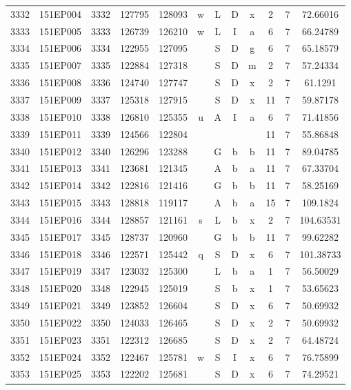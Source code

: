 \begin{tabular}{|*{12}{c|}}
3332 & 151EP004 & 3332 & 127795 & 128093 & w & L & D & x & 2 & 7 & 72.66016 \\ 
3333 & 151EP005 & 3333 & 126739 & 126210 & w & L & I & a & 6 & 7 & 66.24789 \\ 
3334 & 151EP006 & 3334 & 122955 & 127095 &  & S & D & g & 6 & 7 & 65.18579 \\ 
3335 & 151EP007 & 3335 & 122884 & 127318 &  & S & D & m & 2 & 7 & 57.24334 \\ 
3336 & 151EP008 & 3336 & 124740 & 127747 &  & S & D & x & 2 & 7 & 61.1291 \\ 
3337 & 151EP009 & 3337 & 125318 & 127915 &  & S & D & x & 11 & 7 & 59.87178 \\ 
3338 & 151EP010 & 3338 & 126810 & 125355 & u & A & I & a & 6 & 7 & 71.41856 \\ 
3339 & 151EP011 & 3339 & 124566 & 122804 &  &  &  &  & 11 & 7 & 55.86848 \\ 
3340 & 151EP012 & 3340 & 126296 & 123288 &  & G & b & b & 11 & 7 & 89.04785 \\ 
3341 & 151EP013 & 3341 & 123681 & 121345 &  & A & b & a & 11 & 7 & 67.33704 \\ 
3342 & 151EP014 & 3342 & 122816 & 121416 &  & G & b & b & 11 & 7 & 58.25169 \\ 
3343 & 151EP015 & 3343 & 128818 & 119117 &  & A & b & a & 15 & 7 & 109.1824 \\ 
3344 & 151EP016 & 3344 & 128857 & 121161 & s & L & b & x & 2 & 7 & 104.63531 \\ 
3345 & 151EP017 & 3345 & 128737 & 120960 &  & G & b & b & 11 & 7 & 99.62282 \\ 
3346 & 151EP018 & 3346 & 122571 & 125442 & q & S & D & x & 6 & 7 & 101.38733 \\ 
3347 & 151EP019 & 3347 & 123032 & 125300 &  & L & b & a & 1 & 7 & 56.50029 \\ 
3348 & 151EP020 & 3348 & 122945 & 125019 &  & S & b & x & 1 & 7 & 53.65623 \\ 
3349 & 151EP021 & 3349 & 123852 & 126604 &  & S & D & x & 6 & 7 & 50.69932 \\ 
3350 & 151EP022 & 3350 & 124033 & 126465 &  & S & D & x & 2 & 7 & 50.69932 \\ 
3351 & 151EP023 & 3351 & 122312 & 126685 &  & S & D & x & 2 & 7 & 64.48724 \\ 
3352 & 151EP024 & 3352 & 122467 & 125781 & w & S & I & x & 6 & 7 & 76.75899 \\ 
3353 & 151EP025 & 3353 & 122202 & 125681 &  & S & D & x & 6 & 7 & 74.29521 \\ 

\end{tabular}
